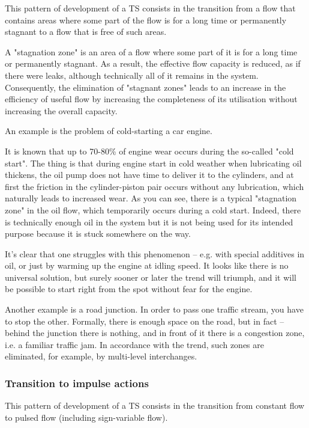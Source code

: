 \documentclass[a4paper,11pt]{article}
\begin{document}
This pattern of development of a TS consists in the transition from a flow
that contains areas where some part of the flow is for a long time or
permanently stagnant to a flow that is free of such areas.

A "stagnation zone" is an area of a flow where some part of it is for a long
time or permanently stagnant. As a result, the effective flow capacity is
reduced, as if there were leaks, although technically all of it remains in the
system. Consequently, the elimination of "stagnant zones" leads to an increase
in the efficiency of useful flow by increasing the completeness of its
utilisation without increasing the overall capacity.

An example is the problem of cold-starting a car engine.

It is known that up to 70-80\% of engine wear occurs during the so-called
"cold start". The thing is that during engine start in cold weather when
lubricating oil thickens, the oil pump does not have time to deliver it to the
cylinders, and at first the friction in the cylinder-piston pair occurs
without any lubrication, which naturally leads to increased wear. As you can
see, there is a typical "stagnation zone" in the oil flow, which temporarily
occurs during a cold start. Indeed, there is technically enough oil in the
system but it is not being used for its intended purpose because it is stuck
somewhere on the way.

It's clear that one struggles with this phenomenon -- e.g. with special
additives in oil, or just by warming up the engine at idling speed. It looks
like there is no universal solution, but surely sooner or later the trend will
triumph, and it will be possible to start right from the spot without fear for
the engine.

Another example is a road junction. In order to pass one traffic stream, you
have to stop the other. Formally, there is enough space on the road, but in
fact -- behind the junction there is nothing, and in front of it there is a
congestion zone, i.e. a familiar traffic jam. In accordance with the trend,
such zones are eliminated, for example, by multi-level interchanges.

\subsubsection{Transition to impulse actions}

This pattern of development of a TS consists in the transition from constant
flow to pulsed flow (including sign-variable flow).
\end{document}
